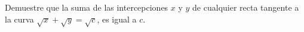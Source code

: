 \item Demuestre que la suma de las intercepciones $x$ y $y$ de cualquier recta tangente a la curva $\sqrt{x} + \sqrt{y} = \sqrt{c}$, es igual a $c$.
